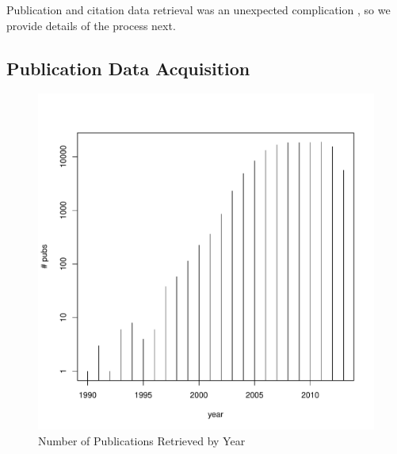 \documentclass{sig-alternate}
\begin{document}
Publication and citation data retrieval was an unexpected complication , so we provide details of the process next. 
 
\subsection{Publication Data Acquisition} 
 
\begin{figure}[htb] 
  \centering 
    \includegraphics[width=1.0\columnwidth]{images/21_pubs_year_distribution.pdf} 
  \caption{Number of Publications Retrieved by Year}\label{F:pubs-year-distribution} 
\end{figure} 
 
\end{document}
